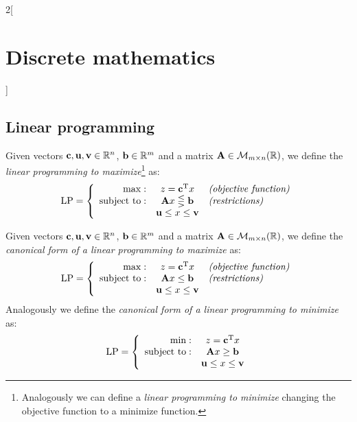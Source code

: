 \documentclass[../../../main.tex]{subfiles}
\begin{document}
\begin{multicols}{2}[\section{Discrete mathematics}]
    \subsection{Linear programming}
    \begin{definition}
        Given vectors $\vb{c},\vb{u},\vb{v}\in\mathbb{R} ^n$, $\vb{b}\in\mathbb{R} ^m$ and a matrix $\vb{A}\in\mathcal{M}_{m\times n}(\mathbb{R} )$, we define the \textit{linear programming to maximize}\footnote{Analogously we can define a \textit{linear programming to minimize} changing the objective function to a minimize function.} as: $$\text{LP}=\left\{\begin{array}{rcl}
                \max:              & z=\vb{c}^{\mathrm{T}}x                       & \textit{(objective function)} \\
                \text{subject to}: & \vb{A}x\lesseqgtr \vb{b} & \textit{(restrictions)}       \\
                                   & \vb{u}\leq x\leq \vb{v}  &
            \end{array}\right.$$
    \end{definition}
    \begin{definition}
        Given vectors $\vb{c},\vb{u},\vb{v}\in\mathbb{R} ^n$, $\vb{b}\in\mathbb{R} ^m$ and a matrix $\vb{A}\in\mathcal{M}_{m\times n}(\mathbb{R} )$, we define the \textit{canonical form of a linear programming to maximize} as: $$\text{LP}=\left\{\begin{array}{rcl}
                \max:              & z=\vb{c}^{\mathrm{T}}x                      & \textit{(objective function)} \\
                \text{subject to}: & \vb{A}x\leq \vb{b}      & \textit{(restrictions)}       \\
                                   & \vb{u}\leq x\leq \vb{v} &
            \end{array}\right.$$
        Analogously we define the \textit{canonical form of a linear programming to minimize} as: $$\text{LP}=\left\{\begin{array}{rc}
                \min:              & z=\vb{c}^{\mathrm{T}}x                      \\
                \text{subject to}: & \vb{A}x\geq \vb{b}      \\
                                   & \vb{u}\leq x\leq \vb{v}
            \end{array}\right.$$
    \end{definition}

\end{multicols}
\end{document}
